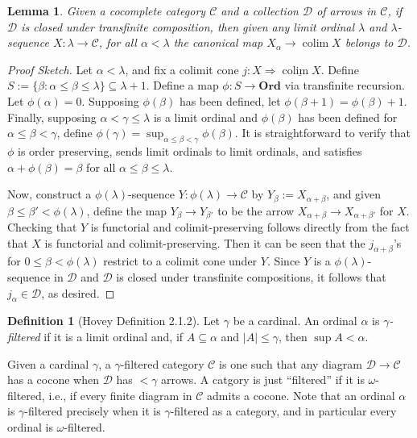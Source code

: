 \documentclass{amsart}
\theoremstyle{plain}
\newtheorem{lemma}[theorem]{Lemma}
\theoremstyle{definition}
\newtheorem{definition}[theorem]{Definition}
\newcommand{\Ord}{\mbf{Ord}}
\newcommand{\sseq}{\subseteq}
\newcommand{\0}{\mathbf{0}}
\newcommand{\cC}{\mathcal C}
\newcommand{\cD}{\mathcal D}
\newcommand{\mbf}[1]{\mathbf{#1}}
\newcommand{\ul}{\underline}
\renewcommand{\(}{\left(}
\renewcommand{\)}{\right)}
\DeclareMathOperator*{\colim}{colim}
\begin{document}
\begin{lemma}\label{stronger_characterization_of_closure_under_transfinite_composition}
  Given a cocomplete category $\cC$ and a collection $\cD$ of arrows in $\cC$, if $\cD$ is closed under transfinite composition, then given any limit ordinal $\lambda$ and $\lambda$-sequence $X:\lambda\to\cC$, for all $\alpha<\lambda$ the canonical map $X_\alpha\to\colim X$ belongs to $\cD$.
\end{lemma}
\begin{proof}[Proof Sketch]
  Let $\alpha<\lambda$, and fix a colimit cone $j:X\Rightarrow\ul{\colim X}$. Define $S:=\{\beta:\alpha\leq\beta\leq\lambda\}\sseq\lambda+1$. Define a map $\phi:S\to\Ord$ via transfinite recursion. Let $\phi(\alpha)=0$. Supposing $\phi(\beta)$ has been defined, let $\phi(\beta+1)=\phi(\beta)+1$. Finally, supposing $\alpha<\gamma\leq\lambda$ is a limit ordinal and $\phi(\beta)$ has been defined for $\alpha\leq\beta<\gamma$, define $\phi(\gamma)=\sup_{\alpha\leq\beta<\gamma}\phi(\beta)$. It is straightforward to verify that $\phi$ is order preserving, sends limit ordinals to limit ordinals, and satisfies $\alpha+\phi(\beta)=\beta$ for all $\alpha\leq\beta\leq\lambda$.
  
  Now, construct a $\phi(\lambda)$-sequence $Y:\phi(\lambda)\to\cC$ by $Y_\beta:=X_{\alpha+\beta}$, and given $\beta\leq\beta'<\phi(\lambda)$, define the map $Y_\beta\to Y_{\beta'}$ to be the arrow $X_{\alpha+\beta}\to X_{\alpha+\beta'}$ for $X$. Checking that $Y$ is functorial and colimit-preserving follows directly from the fact that $X$ is functorial and colimit-preserving. Then it can be seen that the $j_{\alpha+\beta}$'s for $0\leq\beta<\phi(\lambda)$ restrict to a colimit cone under $Y$. Since $Y$ is a $\phi(\lambda)$-sequence in $\cD$ and $\cD$ is closed under transfinite compositions, it follows that $j_\alpha\in\cD$, as desired.
\end{proof}

\begin{definition}[Hovey Definition 2.1.2]
  Let $\gamma$ be a cardinal. An ordinal $\alpha$ is \textit{$\gamma$-filtered} if it is a limit ordinal and, if $A\sseq\alpha$ and $|A|\leq\gamma$, then $\sup A<\alpha$.
\end{definition}

Given a cardinal $\gamma$, a $\gamma$-filtered category $\cC$ is one such that any diagram $\cD\to\cC$ has a cocone when $\cD$ has $<\gamma$ arrows. A catgory is just ``filtered'' if it is $\omega$-filtered, i.e., if every finite diagram in $\cC$ admits a cocone. Note that an ordinal $\alpha$ is $\gamma$-filtered precisely when it is $\gamma$-filtered as a category, and in particular every ordinal is $\omega$-filtered.
\end{document}
